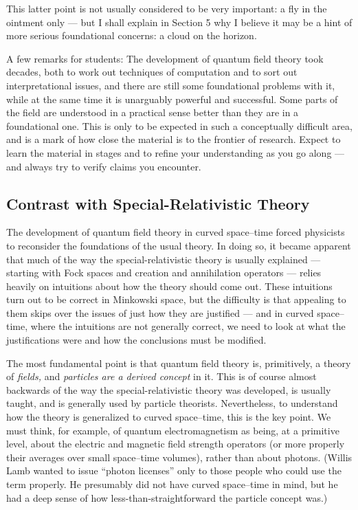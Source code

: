 \documentclass[
%
draft    %
,numberedheadings 
,bibliocites
  ]
  {aipproc}
\begin{document}
\noindent This latter point is not usually considered to be very important:  a fly in the ointment only --- but I shall explain
in Section 5 why I believe it may be a hint of more serious foundational concerns:  a cloud on the horizon.


A few remarks for students:  The development of quantum field theory took decades, both to work out techniques of computation and to sort out interpretational issues, and there are still some foundational problems with it, while at the same time it is unarguably powerful and successful.  Some parts of the field are understood in a practical sense better than they are in a foundational one.  This is only to be expected in such a conceptually difficult area, and is a mark of how close the material is to the frontier of research.  Expect to learn the material in stages and to refine your understanding as you go along --- and always try to verify claims you encounter.

\subsection{Contrast with Special-Relativistic Theory}

The development of quantum field theory in curved space--time forced physicists to reconsider the foundations of the usual theory.  In doing so, it became apparent that much of the
way the special-relativistic theory is usually explained --- starting with Fock spaces and creation and annihilation operators --- relies heavily on intuitions about how the theory should come out.  These intuitions turn out to be correct in Minkowski space, but the difficulty is that appealing to them skips over the issues of just how they are justified --- and in curved space--time, where the intuitions are not generally correct, we need to look at what the justifications were and how the conclusions must be modified.

The most fundamental point is that quantum field theory is, primitively, a theory of {\em fields,} and {\em particles are a derived concept} in it.  This is of course almost backwards of the way the special-relativistic theory was developed, is usually taught, and is generally used by particle theorists.    Nevertheless, to understand how the theory is generalized to curved space--time, this is the key point.  We must think, for example, of quantum electromagnetism as being, at a primitive level, about the electric and magnetic field strength operators (or more properly their averages over small space--time volumes), rather than about photons.  (Willis Lamb wanted to issue ``photon licenses'' only to those people who could use the term properly.  He presumably did not have curved 
space--time in mind, but he had a deep sense of how less-than-straightforward the particle concept was.)
\end{document}

